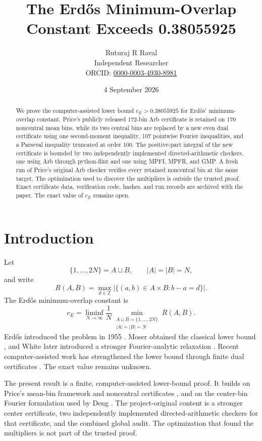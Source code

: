 \documentclass[11pt]{article}
\title{The Erd\H{o}s Minimum-Overlap Constant Exceeds 0.38055925}
\author{Ruturaj R Raval\\
\small Independent Researcher\\
\small ORCID: \href{https://orcid.org/0000-0003-4930-8981}
{0000-0003-4930-8981}}
\date{4 September 2026}
\begin{document}
\maketitle

\begin{abstract}
We prove the computer-assisted lower bound \(c_E>0.38055925\) for
Erd\H{o}s' minimum-overlap constant. Price's publicly released 172-bin Arb
certificate is retained on 170 noncentral mean bins, while its two central
bins are replaced by a new even dual certificate using one second-moment
inequality, 107 pointwise Fourier inequalities, and a Parseval inequality
truncated at order 100. The positive-part integral of the new certificate is
bounded by two independently implemented directed-arithmetic checkers, one
using Arb through python-flint and one using MPFI, MPFR, and GMP. A fresh run
of Price's original Arb checker verifies every retained noncentral bin at the
same target. The optimization used to discover the multipliers is outside the
trusted proof. Exact certificate data, verification code, hashes, and run
records are archived with the paper. The exact value of \(c_E\) remains open.
\end{abstract}

\section{Introduction}

Let
\[
  \{1,\ldots,2N\}=A\sqcup B,\qquad |A|=|B|=N,
\]
and write
\[
  R(A,B)=\max_{d\in\mathbb Z}
  |\{(a,b)\in A\times B:b-a=d\}|.
\]
The Erd\H{o}s minimum-overlap constant is
\[
  c_E=\liminf_{N\to\infty}
  \frac1N\min_{\substack{A\sqcup B=\{1,\ldots,2N\}\\|A|=|B|=N}}
  R(A,B).
\]
Erd\H{o}s introduced the problem in 1955 \cite{Erdos1955}. Moser obtained the
classical lower bound \cite{Moser1959}, and White later introduced a stronger
Fourier-analytic relaxation \cite{White2023}. Recent computer-assisted work
has strengthened the lower bound through finite dual certificates
\cite{Chung2026,Price2026,Deng2026}. The exact value remains unknown.

The present result is a finite, computer-assisted lower-bound proof. It
builds on Price's mean-bin framework and noncentral certificates
\cite{Price2026}, and on the center-bin Fourier formulation used by Deng
\cite{Deng2026}. The project-original content is a stronger center
certificate, two independently implemented directed-arithmetic checkers for
that certificate, and the combined global audit. The optimization that found
the multipliers is not part of the trusted proof.
\end{document}
